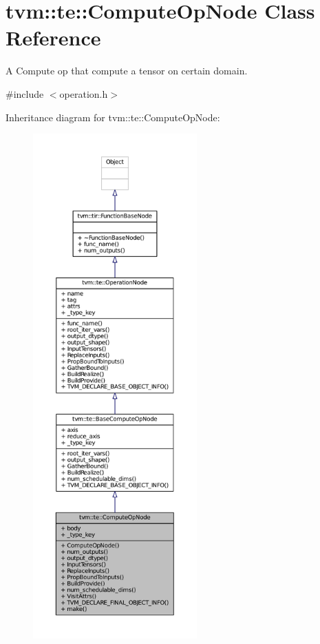 \hypertarget{classtvm_1_1te_1_1ComputeOpNode}{}\section{tvm\+:\+:te\+:\+:Compute\+Op\+Node Class Reference}
\label{classtvm_1_1te_1_1ComputeOpNode}


A Compute op that compute a tensor on certain domain.  




{\ttfamily \#include $<$operation.\+h$>$}



Inheritance diagram for tvm\+:\+:te\+:\+:Compute\+Op\+Node\+:
\nopagebreak
\begin{figure}[H]
\begin{center}
\leavevmode
\includegraphics[height=550pt]{classtvm_1_1te_1_1ComputeOpNode__inherit__graph}
\end{center}
\end{figure}


